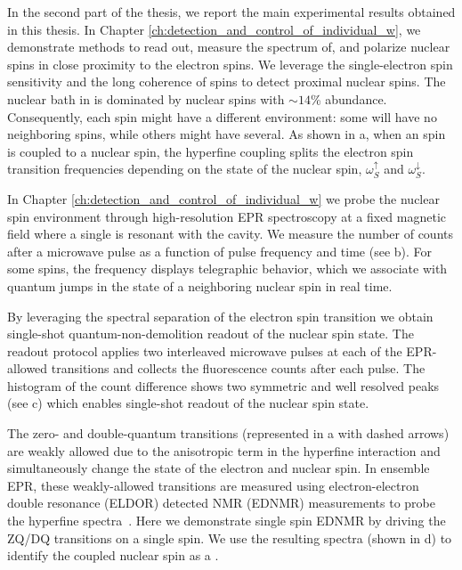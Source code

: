 In the second part of the thesis, we report the main experimental results obtained in this thesis. In Chapter \ref{ch:detection_and_control_of_individual_w}, we demonstrate methods to read out, measure the spectrum of, and polarize nuclear spins in close proximity to the electron spins. We leverage the single-electron spin sensitivity and the long coherence of \Er spins to detect proximal nuclear spins. The nuclear bath in \Ca is dominated by \W nuclear spins with $\sim14$\% abundance. Consequently, each \Er spin might have a different environment: some will have no neighboring \W spins, while others might have several. As shown in a, when an \Er spin is coupled to a \W nuclear spin, the hyperfine coupling splits the electron spin transition frequencies depending on the state of the \W nuclear spin, $\omega_S^\uparrow$ and $\omega_S^\downarrow$.

In Chapter \ref{ch:detection_and_control_of_individual_w} we probe the nuclear spin environment through high-resolution EPR spectroscopy at a fixed magnetic field where a single \Er is resonant with the cavity. We measure the number of counts after a microwave pulse as a function of pulse frequency and time (see b). For some \Er spins, the frequency displays telegraphic behavior, which we associate with quantum jumps in the state of a neighboring \W nuclear spin in real time.

By leveraging the spectral separation of the electron spin transition we obtain single-shot quantum-non-demolition readout of the nuclear spin state. The readout protocol applies two interleaved microwave pulses at each of the EPR-allowed transitions and collects the fluorescence counts after each pulse. The histogram of the count difference shows two symmetric and well resolved peaks (see c) which enables single-shot readout of the nuclear spin state. 

The zero- and double-quantum transitions (represented in a with dashed arrows) are weakly allowed due to the anisotropic term in the hyperfine interaction and simultaneously change the state of the electron and nuclear spin. In ensemble EPR, these weakly-allowed transitions are measured using electron-electron double resonance (ELDOR) detected NMR (EDNMR) measurements to probe the hyperfine spectra~. Here we demonstrate single spin EDNMR by driving the ZQ/DQ transitions on a single \Er spin. We use the resulting spectra (shown in d) to identify the coupled nuclear spin as a \W.

